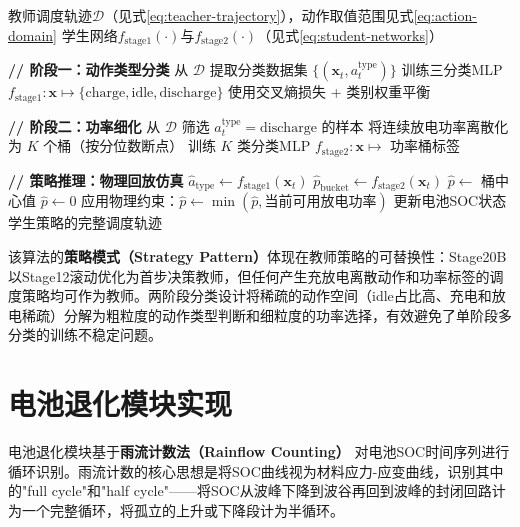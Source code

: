 \documentclass[12pt,a4paper]{ctexbook}
\begin{document}
\begin{algorithm}[H]
\caption{两阶段神经网络策略蒸馏}
\label{alg:distillation}
\begin{algorithmic}[1]
\Require 教师调度轨迹$\mathcal{D}$（见式\ref{eq:teacher-trajectory}），动作取值范围见式\ref{eq:action-domain}
\Ensure 学生网络$f_{\text{stage1}}(\cdot)$与$f_{\text{stage2}}(\cdot)$（见式\ref{eq:student-networks}）

\State \textbf{// 阶段一：动作类型分类}
\State 从 $\mathcal{D}$ 提取分类数据集 $\{(\mathbf{x}_t, a_t^{\text{type}})\}$
\State 训练三分类MLP $f_{\text{stage1}}: \mathbf{x} \mapsto \{\text{charge}, \text{idle}, \text{discharge}\}$
\State 使用交叉熵损失 + 类别权重平衡

\State \textbf{// 阶段二：功率细化}
\State 从 $\mathcal{D}$ 筛选 $a_t^{\text{type}} = \text{discharge}$ 的样本
\State 将连续放电功率离散化为 $K$ 个桶（按分位数断点）
\State 训练 $K$ 类分类MLP $f_{\text{stage2}}: \mathbf{x} \mapsto$ 功率桶标签

\State \textbf{// 策略推理：物理回放仿真}
    \State $\hat{a}_{\text{type}} \gets f_{\text{stage1}}(\mathbf{x}_t)$
        \State $\hat{p}_{\text{bucket}} \gets f_{\text{stage2}}(\mathbf{x}_t)$
        \State $\hat{p} \gets$ 桶中心值
    \Else
        \State $\hat{p} \gets 0$
    \EndIf
    \State 应用物理约束：$\hat{p} \gets \min(\hat{p}, \text{当前可用放电功率})$
    \State 更新电池SOC状态
\EndFor
\State \Return 学生策略的完整调度轨迹
\end{algorithmic}
\end{algorithm}

该算法的\textbf{策略模式（Strategy Pattern）}体现在教师策略的可替换性：Stage20B以Stage12滚动优化为首步决策教师，但任何产生充放电离散动作和功率标签的调度策略均可作为教师。两阶段分类设计将稀疏的动作空间（idle占比高、充电和放电稀疏）分解为粗粒度的动作类型判断和细粒度的功率选择，有效避免了单阶段多分类的训练不稳定问题。\cite{policy-distillation-2016,design-patterns}

\section{电池退化模块实现}

电池退化模块基于\textbf{雨流计数法（Rainflow Counting）} 对电池SOC时间序列进行循环识别。雨流计数的核心思想是将SOC曲线视为材料应力-应变曲线，识别其中的"full cycle"和"half cycle"——将SOC从波峰下降到波谷再回到波峰的封闭回路计为一个完整循环，将孤立的上升或下降段计为半循环。\cite{rainflow-soc-2022}
\end{document}
